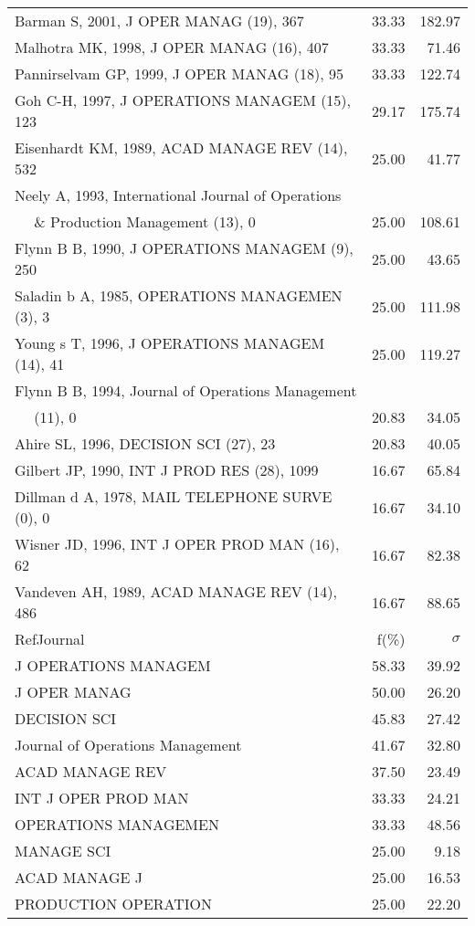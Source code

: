 \documentclass[a4paper,11pt]{report}
\begin{document}
\begin{landscape}
\begin{table}[!ht]
{\begin{tabular}{|l r r|}
Barman S, 2001, J OPER MANAG (19), 367 & 33.33 & 182.97\\
Malhotra MK, 1998, J OPER MANAG (16), 407 & 33.33 & 71.46\\
Pannirselvam GP, 1999, J OPER MANAG (18), 95 & 33.33 & 122.74\\
Goh C-H, 1997, J OPERATIONS MANAGEM (15), 123 & 29.17 & 175.74\\
Eisenhardt KM, 1989, ACAD MANAGE REV (14), 532 & 25.00 & 41.77\\
Neely A, 1993, International Journal of Operations &  & \\
$\quad$ \& Production Management (13), 0 & 25.00 & 108.61\\
Flynn B B, 1990, J OPERATIONS MANAGEM (9), 250 & 25.00 & 43.65\\
Saladin b A, 1985, OPERATIONS MANAGEMEN (3), 3 & 25.00 & 111.98\\
Young s T, 1996, J OPERATIONS MANAGEM (14), 41 & 25.00 & 119.27\\
Flynn B B, 1994, Journal of Operations Management &  & \\
$\quad$ (11), 0 & 20.83 & 34.05\\
Ahire SL, 1996, DECISION SCI (27), 23 & 20.83 & 40.05\\
Gilbert JP, 1990, INT J PROD RES (28), 1099 & 16.67 & 65.84\\
Dillman d A, 1978, MAIL TELEPHONE SURVE (0), 0 & 16.67 & 34.10\\
Wisner JD, 1996, INT J OPER PROD MAN (16), 62 & 16.67 & 82.38\\
Vandeven AH, 1989, ACAD MANAGE REV (14), 486 & 16.67 & 88.65\\
\hline
\hline
RefJournal & f(\%) & $\sigma$\\
\hline
J OPERATIONS MANAGEM & 58.33 & 39.92\\
J OPER MANAG & 50.00 & 26.20\\
DECISION SCI & 45.83 & 27.42\\
Journal of Operations Management & 41.67 & 32.80\\
ACAD MANAGE REV & 37.50 & 23.49\\
INT J OPER PROD MAN & 33.33 & 24.21\\
OPERATIONS MANAGEMEN & 33.33 & 48.56\\
MANAGE SCI & 25.00 & 9.18\\
ACAD MANAGE J & 25.00 & 16.53\\
PRODUCTION OPERATION & 25.00 & 22.20\\
\hline
\end{tabular}
}
\end{table}

\end{landscape}
\end{document}
